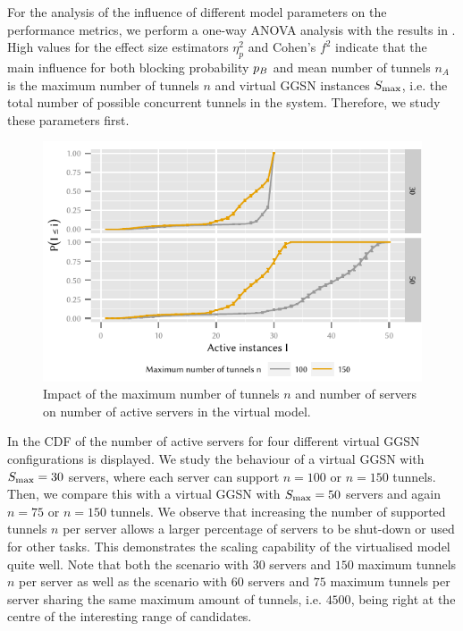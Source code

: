 For the analysis of the influence of different model parameters on the performance metrics, we perform a one-way ANOVA analysis with the results in .
High values for the effect size estimators \(\eta_p^2\) and Cohen's \(f^2\)\cite{Ellis2010} indicate that the main influence for both blocking probability \(p_B\) and mean number of tunnels \(n_A\) is the maximum number of tunnels \(n\) and virtual \gls{GGSN} instances \(S_{\max}\), i.e. the total number of possible concurrent tunnels in the system.
Therefore, we study these parameters first.

\begin{figure}
  \centering
  \includegraphics{cloud/virtualized_network_functions/performance_evaluation/figures/instanceuse_multiserver}
  \caption{Impact of the maximum number of tunnels \(n\) and number of servers \maxServers on number of active servers in the virtual  model.}
  \label{fig:cloud:virtualized_network_functions:performance_evaluation:virtual_ggsn:instanceuse_multiserver}
\end{figure}

In  the \gls{CDF} of the number of active servers for four different virtual \gls{GGSN} configurations is displayed.
We study the behaviour of a virtual \gls{GGSN} with \(S_{\max} = 30\) servers, where each server can support \(n = 100\) or \(n = 150\) tunnels.  
Then, we compare this with a virtual \gls{GGSN} with \(S_{\max} = 50\) servers and again \(n = 75\) or \(n = 150\) tunnels.
We observe that increasing the number of supported tunnels \(n\) per server allows a larger percentage of servers to be shut-down or used for other tasks. This demonstrates the scaling capability of the virtualised model quite well.
Note that both the scenario with \(30\) servers \maxServers and \(150\) maximum tunnels \(n\) per server as well as the scenario with \(60\) servers \maxServers and \(75\) maximum tunnels per server sharing the same maximum amount of tunnels, i.e. \(4500\), being right at the centre of the interesting range of candidates.


